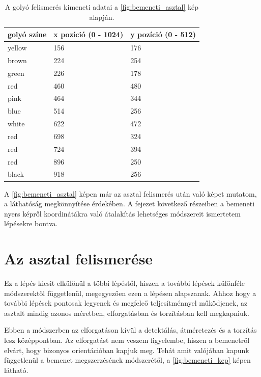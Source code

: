 \begin{table}[!ht]
	\footnotesize
	\centering
	\begin{tabular}{ l l l }
		\toprule
		golyó színe & x pozíció (0 - 1024) & y pozíció (0 - 512) \\
		\midrule
		yellow & 156 & 176\\
        brown  & 224 & 254\\
        green  & 226 & 178\\
        red    & 460 & 480\\
        pink   & 464 & 344\\
        blue   & 514 & 256\\
        white  & 622 & 472\\
        red    & 698 & 324\\
        red    & 724 & 394\\
        red    & 896 & 250\\
        black  & 918 & 256\\
		\bottomrule
	\end{tabular}
	\caption{A golyó felismerés kimeneti adatai a \ref{fig:bemeneti_asztal} kép alapján.}
	\label{tab:felismert_koordinatak}
\end{table}

\par A \ref{fig:bemeneti_asztal} képen már az asztal felismerés után való képet mutatom, a láthatóság megkönnyítése érdekében. A fejezet következő részeiben a bemeneti nyers képről koordinátákra való átalakítás lehetséges módszereit ismertetem lépésekre bontva.

\section{Az asztal felismerése}
Ez a lépés kicsit elkülönül a többi lépéstől, hiszen a további lépések különféle módszerektől függetlenül, megegyezően ezen a lépésen alapszanak. Ahhoz hogy a további lépések pontosak legyenek és megfeleő teljesítménnyel működjenek, az asztalt mindig azonos méretben, elforgatásban és torzításban kell megkapniuk.
\par Ebben a módszerben az elforgatáson kívül a detektálás, átméretezés és a torzítás lesz középpontban. Az elforgatást nem veszem figyelembe, hiszen a bemenetről elvárt, hogy bizonyos orientációban kapjuk meg. Tehát amit valójában kapunk függetlenül a bemenet megszerzésének módszerétől, a \ref{fig:bemeneti_kep} képen látható.

